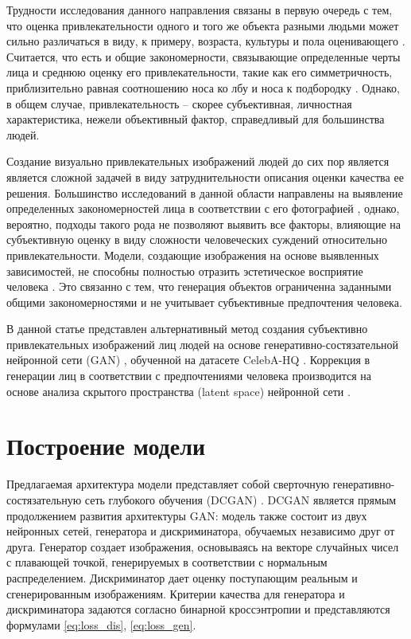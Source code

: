 \documentclass[60x84/16,8pt]{ittmm}
\begin{document}
Трудности исследования данного направления связаны в первую очередь с тем, что
оценка привлекательности одного и того же объекта разными людьми может сильно различаться
в виду, к примеру, возраста, культуры и пола оценивающего
\cite{facial-attractiveness-1, facial-attractiveness-2, facial-attractiveness-3}.
Считается, что есть и общие закономерности, связывающие определенные черты лица
и среднюю оценку его привлекательности, такие как его симметричность, приблизительно
равная соотношению носа ко лбу и носа к подбородку \cite{facial-attractiveness-math-1}.
Однако, в общем случае, привлекательность -- скорее субъективная, личностная характеристика,
нежели объективный фактор, справедливый для большинства людей.

Создание визуально привлекательных изображений людей до сих пор
является является сложной задачей в виду затруднительности описания
оценки качества ее решения. Большинство исследований в данной области
направлены на выявление определенных закономерностей лица в соответствии
с его фотографией \cite{facial-attractiveness-math-2, facial-attractiveness-math-3, facial-attractiveness-math-4},
однако, вероятно, подходы такого рода не позволяют выявить все
факторы, влияющие на субъективную оценку в виду сложности человеческих суждений
относительно привлекательности. Модели, создающие изображения на основе выявленных
зависимостей, не способны полностью отразить эстетическое восприятие человека \cite{attr-models-complicated}.
Это связанно с тем, что генерация объектов ограниченна заданными
общими закономерностями и не учитывает субъективные предпочтения человека.

В данной статье представлен альтернативный метод создания субъективно привлекательных
изображений лиц людей на основе генеративно-состязательной нейронной сети (GAN) \cite{gan},
обученной на датасете CelebA-HQ \cite{celeba-hq}.
Коррекция в генерации лиц в соответствии с предпочтениями человека производится
на основе анализа скрытого пространства (latent space) нейронной сети \cite{latent-space-exploration}. 

\section{Построение модели} 
\label{sec:base-section}

Предлагаемая архитектура модели представляет собой сверточную
генеративно-состязательную сеть глубокого обучения (DCGAN) \cite{dcgan}.
DCGAN является прямым продолжением развития архитектуры GAN: модель также 
состоит из двух нейронных сетей, генератора и дискриминатора, обучаемых независимо друг от друга.
Генератор создает изображения, основываясь на векторе случайных чисел с плавающей точкой,
генерируемых в соответствии с нормальным распределением. Дискриминатор дает оценку поступающим
реальным и сгенерированным изображениям. Критерии качества для генератора и дискриминатора задаются согласно
бинарной кроссэнтропии и представляются формулами \eqref{eq:loss_dis}, \eqref{eq:loss_gen}.
\end{document}
